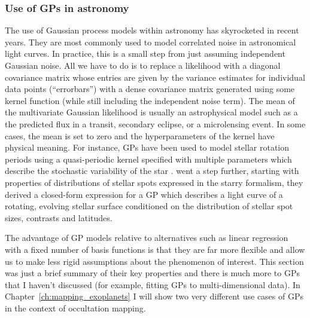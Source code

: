 \documentclass[12pt,dvipsnames]{report}
\newcommand{\ssf}[1]{\textsf{#1}}
\begin{document}
\subsubsection{Use of GPs in astronomy}
The use of Gaussian process models within astronomy has skyrocketed in recent
years. They are most commonly used to model correlated
noise in astronomical light curves. In practice, this is a small step from just
assuming independent Gaussian noise. All we have to do is to replace a
likelihood with a diagonal covariance matrix whose entries are given by the
variance estimates for individual data points (``errorbars'') with a dense
covariance matrix generated using some kernel function (while still
including the independent noise term). The mean of the multivariate Gaussian
likelihood is usually an astrophysical model such as a the predicted flux in a transit, 
secondary eclipse, or a microlensing event.
In some cases, the mean is
set to zero and the hyperparameters of the kernel have physical meaning. For
instance, GPs have been used to model stellar rotation periods using a
quasi-periodic kernel specified with multiple parameters which describe the
stochastic variability of the star \citep{2018MNRAS.474.2094A}.
\citet{2021AJ....162..124L} went a step further, starting with properties of
distributions of stellar spots expressed in the \ssf{starry} formalism, they
derived a closed-form expression for a GP which describes a light curve of a
rotating, evolving stellar surface conditioned on the distribution of stellar
spot sizes, contrasts and latitudes.

The advantage of GP models relative to alternatives such as linear regression
with a fixed number of basis functions is that they are far more flexible and
allow us to make less rigid assumptions about the phenomenon of interest. This
section was just a brief summary of their key properties and there is much more
to GPs that I haven't discussed (for example, fitting GPs to multi-dimensional
data). In Chapter~\ref{ch:mapping_exoplanets} I will show two very different
use cases of GPs in the context of occultation mapping.
\end{document}
